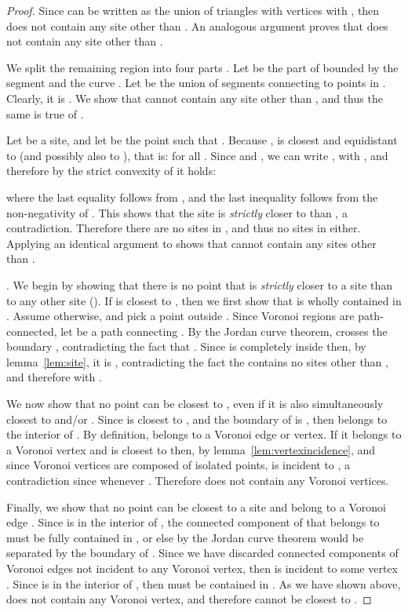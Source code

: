 \documentclass[11pt]{article}
\begin{document}
\begin{proof}
Since  can be written as the union of triangles with vertices  with , 
	then  does not contain any site other than . 
An analogous argument proves that  does not contain any site other than .



We split the remaining region  into four parts . Let  be the part of  bounded by the segment  and the curve . 
Let  be the union of segments connecting  to points in . 
Clearly, it is . We show that  cannot contain any site other than , 
	and thus the same is true of . 



Let  be a site, and let  be the point such that . 
Because ,  is closest and equidistant to  (and possibly also to ), 
	that is:  for all . 
Since  and , we can write , with , 
	and therefore by the strict convexity of  it holds:
	
where the last equality follows from , and the last inequality follows from the non-negativity of . 
This shows that the site  is \emph{strictly} closer to  than , a contradiction. 
Therefore there are no sites in , and thus no sites in  either. 
Applying an identical argument to  shows that  cannot contain any sites other than . 


\vspace*{0.05in}.
We begin by showing that there is no point  that is 
	\emph{strictly} closer to a site  than to any other site (). 
If  is closest to , then we first show that  is wholly contained in . 
Assume otherwise, and pick a point  outside . 
Since Voronoi regions are path-connected, let  be a path connecting . 
By the Jordan curve theorem,  crosses the boundary , 
	contradicting the fact that . 
Since  is completely inside  then, by lemma~\ref{lem:site}, it is , 
	contradicting the fact the  contains no sites other than , and therefore  with . 


We now show that no point  can be closest to , even if it is also simultaneously closest to 
	 and/or . 
Since  is closest to , 
	and the boundary of  is , then  belongs to the interior of . 
By definition,  belongs to a Voronoi edge or vertex. If it belongs to a Voronoi vertex and is closest to  then, 
	by lemma~\ref{lem:vertexincidence}, and since Voronoi vertices are composed of isolated points, 
	 is incident to , a contradiction since  whenever . 
Therefore  does not contain any Voronoi vertices. 



Finally, we show that no point  can be closest to a site  
	and belong to a Voronoi edge . 
Since  is in the interior of , the connected component  of  that  belongs to 
	must be fully contained in , 
	or else by the Jordan curve theorem  would be separated by the boundary  of . 
Since we have discarded connected components of Voronoi edges not incident to any Voronoi vertex, 
	then  is incident to some vertex . 
Since  is in the interior of , then  must be contained in . 
As we have shown above,  does not contain any Voronoi vertex, and therefore  cannot be closest to . 






\end{proof}
\end{document}
